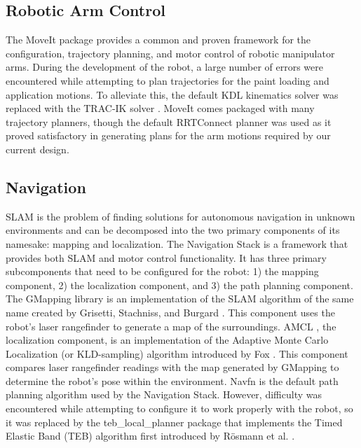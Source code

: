 \subsection{Robotic Arm Control}
The MoveIt package provides a common and proven framework for the configuration, trajectory planning, and motor control of robotic manipulator arms. During the development of the robot, a large number of errors were encountered while attempting to plan trajectories for the paint loading and application motions. To alleviate this, the default KDL kinematics solver was replaced with the TRAC-IK solver \cite{trac_ik}. MoveIt comes packaged with many trajectory planners, though the default RRTConnect planner \cite{kuffner2000rrt} was used as it proved satisfactory in generating plans for the arm motions required by our current design.

\subsection{Navigation}
SLAM is the problem of finding solutions for autonomous navigation in unknown environments and can be decomposed into the two primary components of its namesake: mapping and localization. 
The Navigation Stack is a framework that provides both SLAM and motor control functionality. It has three primary subcomponents that need to be configured for the robot: 1) the mapping component, 2) the localization component, and 3) the path planning component. The GMapping library \cite{gmapping} is an implementation of the SLAM algorithm of the same name created by Grisetti, Stachniss, and Burgard \cite{grisetti_gmapping}. This component uses the robot's laser rangefinder to generate a map of the surroundings. AMCL \cite{amcl}, the localization component, is an implementation of the Adaptive Monte Carlo Localization (or KLD-sampling) algorithm introduced by Fox \cite{fox2002kld}. This component compares laser rangefinder readings with the map generated by GMapping to determine the robot's pose within the environment. Navfn \cite{navfn} is the default path planning algorithm used by the Navigation Stack. However, difficulty was encountered while attempting to configure it to work properly with the robot, so it was replaced by the teb\_local\_planner package \cite{teb} that implements the Timed Elastic Band (TEB) algorithm first introduced by R{\"o}smann et al. \cite{rosmann2012trajectory}.

